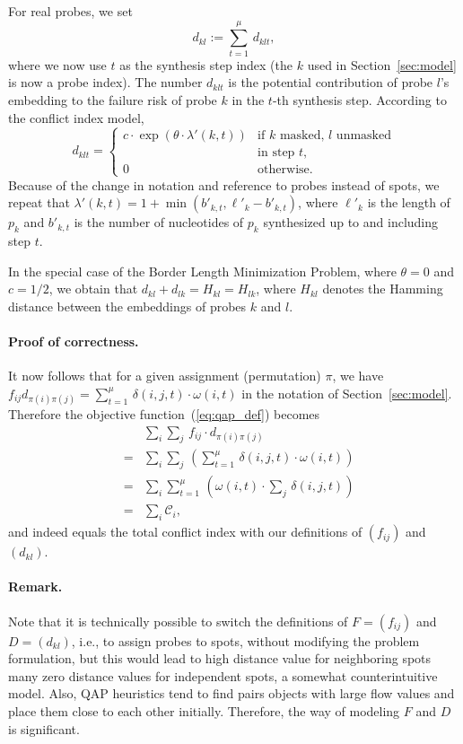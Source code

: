 \documentclass[english]{lni}
\begin{document}
For real probes, we set
\[ d_{kl} := \sum_{t=1}^\mu\, d_{klt}, \]
where we now use $t$ as the synthesis step index (the $k$ used in
Section~\ref{sec:model} is now a probe index). The number $d_{klt}$ is the
potential contribution of probe $l$'s embedding to the failure risk of probe
$k$ in the $t$-th synthesis step. According to the conflict index model,
\[ d_{klt}  = \left\{ \begin{array}{ll}
    c \cdot \exp(\theta \cdot \lambda'(k,t)) 
    & \mbox{if $k$ masked, $l$ unmasked}\\
    & \mbox{in step $t$,}\\
    0
    & \mbox{otherwise.}
  \end{array} \right.
\]
Because of the change in notation and reference to probes instead of spots, we
repeat that $\lambda'(k,t) = 1 + \min(b'_{k,t},\ell'_{k} - b'_{k,t})$, where
$\ell'_{k}$ is the length of $p_k$ and $b'_{k,t}$ is the number of nucleotides
of $p_k$ synthesized up to and including step $t$.

In the special case of the Border Length Minimization Problem, where
$\theta=0$ and $c=1/2$, we obtain that $d_{kl} + d_{lk} = H_{kl} = H_{lk}$,
where $H_{kl}$ denotes the  Hamming distance between the embeddings of probes
$k$ and $l$.


\paragraph{Proof of correctness.}
It now follows that for a given assignment (permutation) $\pi$, we have
$f_{ij} d_{\pi(i)\pi(j)} = \sum_{t=1}^\mu\, \delta(i,j,t) \cdot \omega(i,t)$
in the notation of Section~\ref{sec:model}. Therefore the objective
function~(\ref{eq:qap_def}) becomes
\begin{eqnarray*}
  & & \sum_i \sum_j\, f_{ij} \cdot d_{\pi(i)\pi(j)}\\
  &=& \sum_i \sum_j\, \left( \sum_{t=1}^\mu\, \delta(i,j,t) \cdot \omega(i,t)  \right)\\
  &=& \sum_i \sum_{t=1}^\mu\, \left( \omega(i,t) \cdot \sum_j\, \delta(i,j,t)  \right)\\
  &=& \sum_i \mathcal{C}_i,
\end{eqnarray*}
and indeed equals the total conflict index with our definitions of $(f_{ij})$
and $(d_{kl})$.


\paragraph{Remark.} 
Note that it is technically possible to switch the definitions of $F=(f_{ij})$
and $D=(d_{kl})$, i.e., to assign probes to spots, without modifying the
problem formulation, but this would lead to high distance value for
neighboring spots many zero distance values for independent spots, a somewhat
counterintuitive model. Also, QAP heuristics tend to find pairs objects with
large flow values and place them close to each other initially. Therefore, the
way of modeling $F$ and $D$ is significant.
\end{document}
